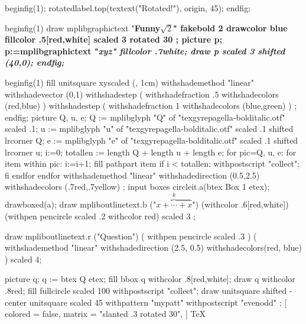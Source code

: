   beginfig(1);
    rotatedlabel.top(textext("Rotated!"), origin, 45);
  endfig;
\endmplibcode
\par
\mplibcode
beginfig(1) %
draw mplibgraphictext "\bf Funny$\sqrt{2}$"
  fakebold 2 %
  drawcolor blue fillcolor .5[red,white]
  scaled 3 rotated 30 ;
picture p;
p:=mplibgraphictext "\it xyz"
  fillcolor .7white;
draw p scaled 3 shifted (40,0);
endfig;
\endmplibcode
\par
{}%
\mplibcode
beginfig(1)
fill unitsquare xyscaled (\mpdim\hsize, 1cm)
    withshademethod "linear"
    withshadevector (0,1)
    withshadestep (
       withshadefraction .5
       withshadecolors (red,blue)
    )
    withshadestep (
       withshadefraction 1
       withshadecolors (blue,green)
    )
    ;
endfig;
\endmplibcode
\leavevmode
\mpfig
picture Q, u, e;
Q := mplibglyph "Q" of "texgyrepagella-bolditalic.otf" scaled .1;
u := mplibglyph "u" of "texgyrepagella-bolditalic.otf" scaled .1 shifted lrcorner Q;
e := mplibglyph "e" of "texgyrepagella-bolditalic.otf" scaled .1 shifted lrcorner u;
i:=0;
totallen := length Q + length u + length e;
for pic=Q, u, e:
  for item within pic:
    i:=i+1;
    fill pathpart item
    if i < totallen: withpostscript "collect"; fi
  endfor
endfor
  withshademethod "linear"
  withshadedirection (0.5,2.5)
  withshadecolors (.7red,.7yellow)
  ;
\endmpfig
{}%
\mpfig* input boxes \endmpfig
\mpfig circleit.a(btex Box 1 etex); drawboxed(a); \endmpfig
\def\mpfiginstancename{mympfig}%
\mpfig
draw mpliboutlinetext.b ("$\overbrace{x+\cdots+x}^k$")
    (withcolor .6[red,white])
    (withpen pencircle scaled .2 withcolor red)
    scaled 3 ;
\endmpfig
\par
\mpfig
  draw mpliboutlinetext.r
    ("Question")
    ( withpen pencircle scaled .3 )
    (
      withshademethod "linear"
      withshadedirection (2.5, 0.5)
      withshadecolors(red, blue)
    )
    scaled 4;
\endmpfig
\par\leavevmode
{}
  \mpfig
    picture q;
    q := btex Q etex;
    fill bbox q withcolor .8[red,white];
    draw q withcolor .8red;
  \endmpfig
\endmppattern
\mpfig
  fill fullcircle scaled 100 withpostscript "collect";
  draw unitsquare shifted - center unitsquare scaled 45
    withpattern "mypatt"
    withpostscript "evenodd"
    ;
\endmpfig
{}
  [
    colored = false,
    matrix = "slanted .3 rotated 30",
  ]
  \fiverm\TeX
\endmppattern
\mpfig

